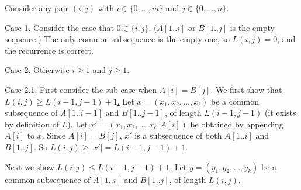 \begin{longFormProof}
  \step Consider any pair $(i, j)$ with $i\in\{0,\ldots,m\}$ and $j\in\{0,\ldots, n\}$.
  \begin{block}[dp: C1]
    \step \underline{Case 1.}
    Consider the case that $0\in \{i, j\}$. ($A[1..i]$ or $B[1..j]$ is the empty sequence.)
    \step The only common subsequence is the empty one,
    so $L(i, j) = 0$, and the recurrence is correct.
  \end{block}
  \begin{block}[dp: C2]
    \step \underline{Case 2.}
    Otherwise $i \ge 1$ and $j \ge 1$.
    \begin{block}[dp: C21]
      \step \underline{Case 2.1.}
      First consider the sub-case when $A[i] = B[j]$.
      \step \underline{We first show that $L(i, j) \ge L(i-1, j-1) + 1$.}
      \step Let $x = (x_1, x_2, \ldots, x_\ell)$ be a common subsequence
      of $A[1..i-1]$ and $B[1..j-1]$, of length $L(i-1, j-1)$
      (it exists by definition of $L$).
      \step Let $x' = (x_1, x_2, \ldots, x_\ell, A[i])$ be obtained by appending $A[i]$ to $x$.
      \step Since $A[i] = B[j]$, $x'$ is a subsequence of both $A[1..i]$ and $B[1..j]$.
      \step[dp: GE1] So $L(i, j) \ge |x'| = L(i-1, j-1) + 1$.

      \smallskip
      \step \underline{Next we show $L(i, j) \le L(i-1, j-1) + 1$.}
      \step Let $y = (y_1, y_2, \ldots, y_k)$ be a common subsequence
      of $A[1..i]$ and $B[1..j]$, of length $L(i, j)$.


\end{block}
\end{block}
\end{longFormProof}
